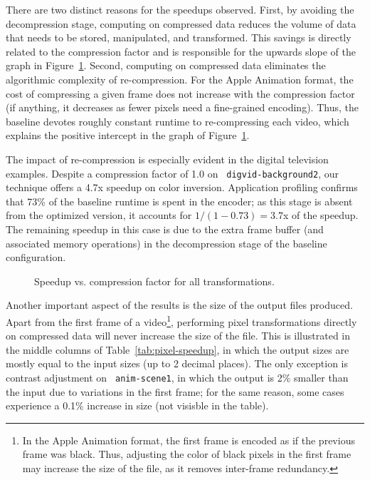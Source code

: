 There are two distinct reasons for the speedups observed.  First, by
avoiding the decompression stage, computing on compressed data reduces
the volume of data that needs to be stored, manipulated, and
transformed.  This savings is directly related to the compression
factor and is responsible for the upwards slope of the graph in
Figure~\ref{fig:speedup-scatter}.  Second, computing on compressed
data eliminates the algorithmic complexity of re-compression.  For the
Apple Animation format, the cost of compressing a given frame does not
increase with the compression factor (if anything, it decreases as
fewer pixels need a fine-grained encoding).  Thus, the baseline
devotes roughly constant runtime to re-compressing each video, which
explains the positive intercept in the graph of
Figure~\ref{fig:speedup-scatter}.

The impact of re-compression is especially evident in the digital
television examples.  Despite a compression factor of 1.0 on {\tt
digvid-background2}, our technique offers a 4.7x speedup on color
inversion.  Application profiling confirms that 
73\% of the baseline runtime is spent in the encoder; as this stage is
absent from the optimized version, it accounts for $1/(1-0.73) = 3.7$x
of the speedup.  The remaining speedup in this case is due to the
extra frame buffer (and associated memory operations) in the
decompression stage of the baseline configuration.
%
%

\begin{figure}[t]
\centering
{}
\caption{Speedup vs. compression factor for all transformations.
\protect\label{fig:speedup-scatter}}
\end{figure}

Another important aspect of the results is the size of the output
files produced.  Apart from the first frame of a video\footnote{In the
Apple Animation format, the first frame is encoded as if the previous
frame was black.  Thus, adjusting the color of black pixels in the
first frame may increase the size of the file, as it removes
inter-frame redundancy.}, performing pixel transformations directly on
compressed data will never increase the size of the file.  This is
illustrated in the middle columns of Table~\ref{tab:pixel-speedup}, in
which the output sizes are mostly equal to the input sizes (up to 2
decimal places).  The only exception is contrast adjustment on {\tt
anim-scene1}, in which the output is 2\% smaller than the input due to
variations in the first frame; for the same reason, some cases
experience a 0.1\% increase in size (not visisble in the table).

